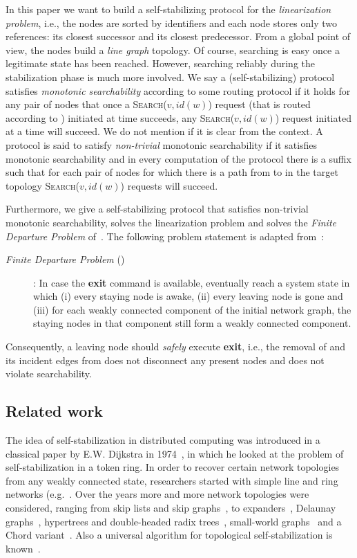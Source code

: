 \documentclass[a4paper,USenglish]{lipics}
\newcommand{\search}[1]{\textsc{Search(\ensuremath{#1})}\xspace}
\newcommand{\fdp}{\xspace}
\begin{document}
In this paper we want to build a self-stabilizing protocol for the \emph{linearization problem}, i.e., the nodes are sorted by identifiers and each node stores only two references: its closest successor and its closest predecessor.
From a global point of view, the nodes build a \emph{line graph} topology.
Of course, searching is easy once a legitimate state has been reached.
However, searching reliably during the stabilization phase is much more involved.
We say a (self-stabilizing) protocol satisfies \emph{monotonic searchability} according to some routing protocol  if it holds for any pair of nodes  that once a \search{v,id(w)} request (that is routed according to ) initiated at time  succeeds, any \search{v,id(w)} request initiated at a time  will succeed.
We do not mention  if it is clear from the context.
A protocol is said to satisfy \emph{non-trivial} monotonic searchability if it satisfies monotonic searchability and in every computation of the protocol there is a suffix such that for each pair of nodes  for which there is a path from  to  in the target topology \search{v,id(w)} requests will succeed.

Furthermore, we give a self-stabilizing protocol that satisfies non-trivial monotonic searchability, solves the linearization problem and solves the \emph{Finite Departure Problem} of~\cite{departure1}. The following problem statement is adapted from~\cite{KoutsopoulosSS15}:
\begin{description}
\item[\emph{Finite Departure Problem} (\fdp)]: In case the \textbf{exit} command is available, eventually reach a system state in which (i) every staying node is awake, (ii) every leaving node is gone and (iii) for each weakly connected component of the initial network graph, the staying nodes in that component still form a weakly connected component.
\end{description}
Consequently, a leaving node  should \emph{safely} execute \textbf{exit}, i.e., the removal of  and its incident edges from  does not disconnect any present nodes and does not violate searchability.


\subsection{Related work}


The idea of self-stabilization in distributed computing was introduced in a classical paper by E.W. Dijkstra in 1974~\cite{Dijkstra74}, in which he looked at the problem of self-stabilization in a token ring. 
In order to recover certain network topologies from any weakly connected state, researchers started with simple line and ring networks (e.g.~\cite{ShakerR05,self-stabilizing-list,self-stabilizing-list2}.
Over the years more and more network topologies were considered, ranging from skip lists and skip graphs~\cite{corona,JRSST09}, to expanders~\cite{DolevT2013}, Delaunay graphs~\cite{JacobRSS2012}, hypertrees and double-headed radix trees~\cite{DolevK08, AspnesW07}, small-world graphs~\cite{KniesburgesKS12} and a Chord variant~\cite{rechord}. 
Also a universal algorithm for topological self-stabilization is known~\cite{DBLP:journals/tcs/BernsGP13}.
\end{document}
